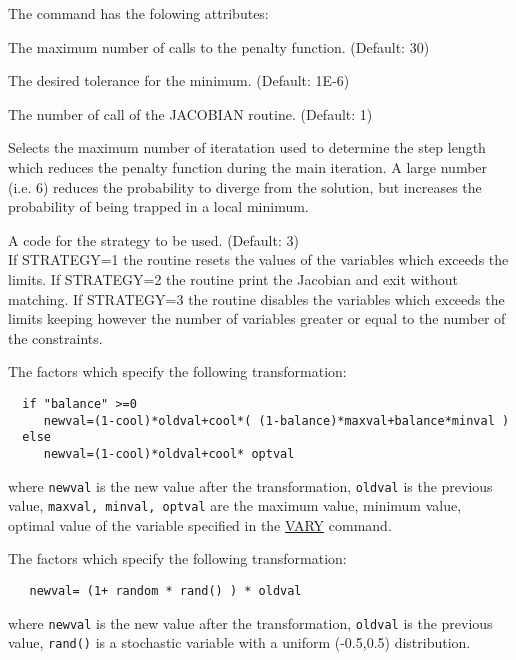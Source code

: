 
The command has the folowing attributes: 
\begin{madlist}
   The maximum number of calls to the penalty function. (Default: 30) 

   The desired tolerance for the minimum. (Default: 1E-6)

   The number of call of the JACOBIAN routine. (Default: 1) 

   Selects the maximum number of iteratation used to
  determine the step length which reduces the penalty function during
  the main iteration. A large number (i.e. 6) reduces the probability
  to diverge from the solution, but increases the probability of being
  trapped in a local minimum.  

   A code for the strategy to be used. (Default: 3)\\
  If STRATEGY=1 the routine resets the values of the variables which
  exceeds the limits. If STRATEGY=2 the routine print the Jacobian
  and exit without matching. If STRATEGY=3 the routine  disables the
  variables which exceeds the limits keeping however the number of
  variables greater or equal to the number of the constraints.  

   The factors which specify the following transformation:
\begin{verbatim}
  if "balance" >=0
     newval=(1-cool)*oldval+cool*( (1-balance)*maxval+balance*minval )
  else
     newval=(1-cool)*oldval+cool* optval
\end{verbatim}
   where \texttt{newval} is the new value after the transformation,
   \texttt{oldval} is the previous value, \texttt{maxval, minval,
     optval} are the maximum value, minimum value, optimal value of
   the variable specified in the \href{match_vary.html}{VARY}
   command.  

    The factors which specify the following transformation:
\begin{verbatim}
   newval= (1+ random * rand() ) * oldval
\end{verbatim}
   where \texttt{newval} is the new value after the transformation,
   \texttt{oldval} is the previous value, \texttt{rand()} is a stochastic
   variable with a uniform (-0.5,0.5) distribution.   
\end{madlist} 

